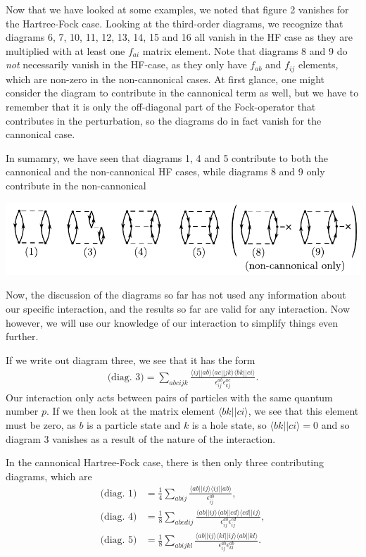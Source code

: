 \documentclass[a4paper, 11pt, notitlepage, english]{article}
\newcommand{\brakket}[2]{\langle #1 || #2 \rangle}
\newcommand{\eps}{\epsilon}
\begin{document}
Now that we have looked at some examples, we noted that figure 2 vanishes for the Hartree-Fock case. Looking at the third-order diagrams, we recognize that diagrams 6, 7, 10, 11, 12, 13, 14, 15 and 16 all vanish in the HF case as they are multiplied with at least one $f_{ai}$ matrix element. Note that diagrams 8 and 9 do \emph{not} necessarily vanish in the HF-case, as they only have $f_{ab}$ and $f_{ij}$ elements, which are non-zero in the non-cannonical cases. At first glance, one might consider the diagram to contribute  in the cannonical term as well, but we have to remember that it is only the off-diagonal part of the Fock-operator that contributes in the perturbation, so the diagrams do in fact vanish for the cannonical case.

In sumamry, we have seen that diagrams 1, 4 and 5 contribute to both the cannonical and the non-cannonical HF cases, while diagrams 8 and 9 only contribute in the non-cannonical
\begin{center}
\includegraphics[width=\textwidth]{project2_5}
\end{center}

Now, the discussion of the diagrams so far has not used any information about our specific interaction, and the results so far are valid for any interaction. Now however, we will use our knowledge of our interaction to simplify things even further.

If we write out diagram three, we see that it has the form
\begin{align*}
    \mbox{(diag.\ 3)} = \sum_{abcijk}\frac{\brakket{ij}{ab}\brakket{ac}{jk}\brakket{bk}{ci}}{\eps_{ij}^{ab}\eps_{kj}^{ac}}.
\end{align*}
Our interaction only acts between pairs of particles with the same quantum number $p$. If we then look at the matrix element $\brakket{bk}{ci}$, we see that this element must be zero, as $b$ is a particle state and $k$ is a hole state, so $\brakket{bk}{ci} = 0$ and so diagram 3 vanishes as a result of the nature of the interaction.

In the cannonical Hartree-Fock case, there is then only three contributing diagrams, which are
\begin{align*}
    \mbox{(diag.\ 1)} &= \frac{1}{4}\sum_{abij}\frac{\brakket{ab}{ij}\brakket{ij}{ab}}{\eps_{ij}^{ab}}, \\
    \mbox{(diag.\ 4)} &= \frac{1}{8}\sum_{abcdij}\frac{\brakket{ab}{ij}\brakket{ab}{cd}\brakket{cd}{ij}}{\eps_{ij}^{ab}\eps_{ij}^{cd}},\\
    \mbox{(diag.\ 5)} &= \frac{1}{8}\sum_{abijkl}\frac{\brakket{ab}{ij}\brakket{kl}{ij}\brakket{ab}{kl}}{\eps_{ij}^{ab}\eps_{kl}^{ab}}.
\end{align*}
\end{document}

